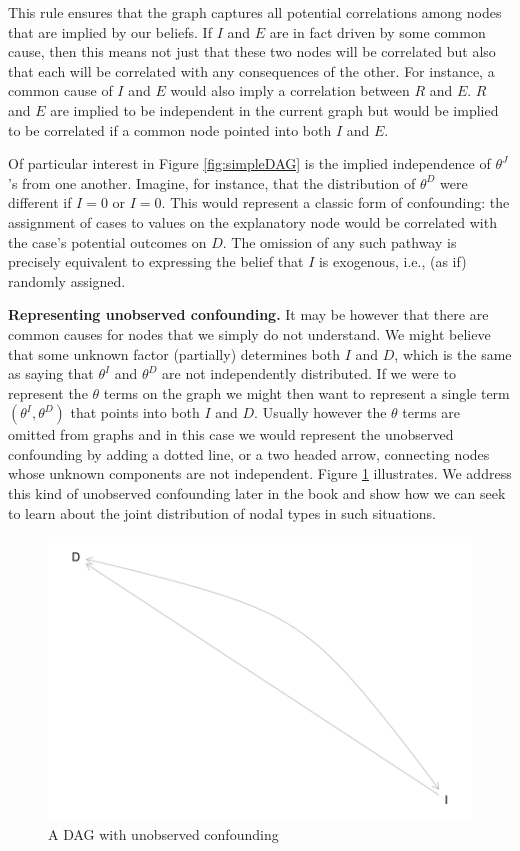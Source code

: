\documentclass[
  12pt,
]{book}
\begin{document}
This rule ensures that the graph captures all potential correlations among nodes that are implied by our beliefs. If \(I\) and \(E\) are in fact driven by some common cause, then this means not just that these two nodes will be correlated but also that each will be correlated with any consequences of the other. For instance, a common cause of \(I\) and \(E\) would also imply a correlation between \(R\) and \(E\). \(R\) and \(E\) are implied to be independent in the current graph but would be implied to be correlated if a common node pointed into both \(I\) and \(E\).

Of particular interest in Figure \ref{fig:simpleDAG} is the implied independence of \(\theta^J\)'s from one another. Imagine, for instance, that the distribution of \(\theta^D\) were different if \(I=0\) or \(I=0\). This would represent a classic form of confounding: the assignment of cases to values on the explanatory node would be correlated with the case's potential outcomes on \(D\). The omission of any such pathway is precisely equivalent to expressing the belief that \(I\) is exogenous, i.e., (as if) randomly assigned.

\textbf{Representing unobserved confounding.} It may be however that there are common causes for nodes that we simply do not understand. We might believe that some unknown factor (partially) determines both \(I\) and \(D\), which is the same as saying that \(\theta^I\) and \(\theta^D\) are not independently distributed. If we were to represent the \(\theta\) terms on the graph we might then want to represent a single term \((\theta^I, \theta^D)\) that points into both \(I\) and \(D\). Usually however the \(\theta\) terms are omitted from graphs and in this case we would represent the unobserved confounding by adding a dotted line, or a two headed arrow, connecting nodes whose unknown components are not independent. Figure \ref{fig:simpleDAGb} illustrates. We address this kind of unobserved confounding later in the book and show how we can seek to learn about the joint distribution of nodal types in such situations.

\begin{figure}

{\centering \includegraphics[width=0.6\linewidth]{ii_files/figure-latex/simpleDAGb-1} 

}

\caption{A DAG with unobserved confounding}\label{fig:simpleDAGb}
\end{figure}
\end{document}
